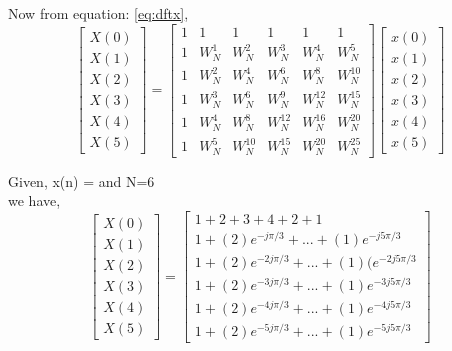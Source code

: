 \documentclass[journal,12pt,twocolumn]{IEEEtran}
\renewcommand\thesection{\arabic{section}}
\begin{document}
\begin{enumerate}[label=\thesection.\arabic*.,ref=\thesection.\theenumi]
Now from equation: \eqref{eq:dftx},
\begin{equation}
 \begin{bmatrix} X(0) \\ X(1) \\ X(2) \\ X(3) \\ X(4) \\ X(5) \end{bmatrix}
=
\begin{bmatrix}
1 & 1 & 1 & 1 & 1 & 1 \\ 1 & W_N^1& W_N^2& W_N^3 & W_N^4 & W_N^5\\1 & W_N^2 & W_N^4 & W_N^6 & W_N^8 & W_N^{10}\\1 & W_N^3 & W_N^6 & W_N^9 & W_N^{12} & W_N^{15}\\1 & W_N^4 & W_N^8 & W_N^{12} & W_N^{16} & W_N^{20}\\1 & W_N^5 & W_N^{10} & W_N^{15} & W_N^{20} &W_N^{25}
\end{bmatrix}
\begin{bmatrix}
x(0) \\ x(1) \\ x(2) \\ x(3) \\ x(4) \\x(5)
\end{bmatrix}
\end{equation}
\bigskip

Given,  x(n) =  and N=6\\
we have,
\begin{equation}
\begin{bmatrix} X(0) \\ X(1) \\ X(2) \\ X(3) \\ X(4) \\ X(5) \end{bmatrix}
=
\begin{bmatrix}
1 +2+3+4+2+1 \\ 1+ (2)e^{-j\pi /3} + ... + (1)e^{-j5\pi /3}\\ 1 + (2)e^{-2j\pi /3} + ... +(1)(e^{-2j5\pi /3}\\ 1 + (2)e^{-3j\pi /3} + ... + (1)e^{-3j5\pi /3}\\ 1 + (2)e^{-4j\pi /3} + ... + (1)e^{-4j5\pi /3}\\ 1 + (2)e^{-5j\pi /3} + ... + (1)e^{-5j5\pi /3}
\end{bmatrix}
\end{equation}
\bigskip


\end{enumerate}
\end{document}
